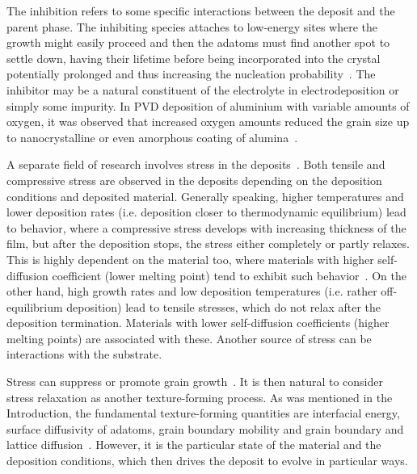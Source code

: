 The inhibition refers to some specific interactions between the deposit and the parent phase. The inhibiting species attaches to low-energy sites where the growth might easily proceed and then the adatoms must find another spot to settle down, having their lifetime before being incorporated into the crystal potentially prolonged and thus increasing the nucleation probability~\cite{Winand1992}. The inhibitor may be a natural constituent of the electrolyte in electrodeposition or simply some impurity. In PVD deposition of aluminium with variable amounts of oxygen, it was observed that increased oxygen amounts reduced the grain size up to nanocrystalline or even amorphous coating of alumina~\cite{Barna1998}.

A separate field of research involves stress in the deposits~\cite{Thornton1989, Thompson1993, Chason2015, Abadias2018}. Both tensile and compressive stress are observed in the deposits depending on the deposition conditions and deposited material. Generally speaking, higher temperatures and lower deposition rates (i.e. deposition closer to thermodynamic equilibrium) lead to behavior, where a compressive stress develops with increasing thickness of the film, but after the deposition stops, the stress either completely or partly relaxes. This is highly dependent on the material too, where materials with higher self-diffusion coefficient (lower melting point) tend to exhibit such behavior~\cite{Chason2002}. On the other hand, high growth rates and low deposition temperatures (i.e. rather off-equilibrium deposition) lead to tensile stresses, which do not relax after the deposition termination. Materials with lower self-diffusion coefficients (higher melting points) are associated with these. Another source of stress can be interactions with the substrate.

Stress can suppress or promote grain growth~\cite{Thompson1993}. It is then natural to consider stress relaxation as another texture-forming process. As was mentioned in the Introduction, the fundamental texture-forming quantities are interfacial energy, surface diffusivity of adatoms, grain boundary mobility and grain boundary and lattice diffusion~\cite{Szpunar1997, Suwas2014}. However, it is the particular state of the material and the deposition conditions, which then drives the deposit to evolve in particular ways.

